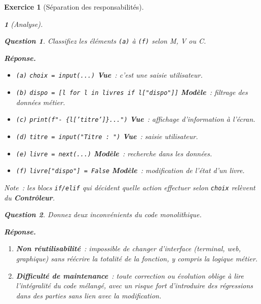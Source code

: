 \documentclass{article}
\theoremstyle{exostyle}
\newtheorem{exo}{Exercice}
\theoremstyle{partiestyle}
\newtheorem{partie}{}[exo]
\theoremstyle{questionstyle}
\newtheorem{questionpartie}{Question}[partie]
\newenvironment{reponse}{%
    \par\smallskip\noindent\textbf{Réponse.}\enspace\ignorespaces
}{%
    \par\smallskip
}
\begin{document}
\begin{exo}[Séparation des responsabilités]

    \begin{partie}[Analyse]

        \begin{questionpartie}
            Classifiez les éléments \texttt{(a)} à \texttt{(f)} selon M, V ou C.
        \end{questionpartie}
        \begin{reponse}
            \begin{itemize}
                \item \texttt{(a)} \texttt{choix = input(...)} \textrightarrow{} \textbf{Vue}~: c'est une saisie utilisateur.
                \item \texttt{(b)} \texttt{dispo = [l for l in livres if l["dispo"]]} \textrightarrow{} \textbf{Modèle}~: filtrage des données métier.
                \item \texttt{(c)} \texttt{print(f"- \{l['titre']\}...")} \textrightarrow{} \textbf{Vue}~: affichage d'information à l'écran.
                \item \texttt{(d)} \texttt{titre = input("Titre : ")} \textrightarrow{} \textbf{Vue}~: saisie utilisateur.
                \item \texttt{(e)} \texttt{livre = next(...)} \textrightarrow{} \textbf{Modèle}~: recherche dans les données.
                \item \texttt{(f)} \texttt{livre["dispo"] = False} \textrightarrow{} \textbf{Modèle}~: modification de l'état d'un livre.
            \end{itemize}
            Note~: les blocs \texttt{if/elif} qui décident quelle action effectuer selon \texttt{choix} relèvent du \textbf{Contrôleur}.
        \end{reponse}

        \begin{questionpartie}
            Donnez deux inconvénients du code monolithique.
        \end{questionpartie}
        \begin{reponse}
            \begin{enumerate}
                \item \textbf{Non réutilisabilité}~: impossible de changer d'interface (terminal, web, graphique) sans réécrire la totalité de la fonction, y compris la logique métier.
                \item \textbf{Difficulté de maintenance}~: toute correction ou évolution oblige à lire l'intégralité du code mélangé, avec un risque fort d'introduire des régressions dans des parties sans lien avec la modification.
            \end{enumerate}
        \end{reponse}


\end{partie}
\end{exo}
\end{document}
